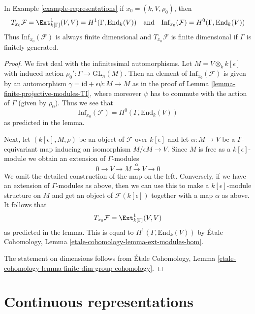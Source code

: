 \begin{lemma}
\label{lemma-representations-TI}
In Example \ref{example-representations}
if $x_0 = (k, V, \rho_0)$, then
$$
T_{x_0}\mathcal{F} = \Ext^1_{k[\Gamma]}(V, V) =
H^1(\Gamma, \text{End}_k(V))
\quad\text{and}\quad
\text{Inf}_{x_0}(\mathcal{F}) = H^0(\Gamma, \text{End}_k(V))
$$
Thus $\text{Inf}_{x_0}(\mathcal{F})$ is always finite dimensional
and $T_{x_0}\mathcal{F}$ is finite dimensional
if $\Gamma$ is finitely generated.
\end{lemma}

\begin{proof}
We first deal with the infinitesimal automorphisms.
Let $M = V \otimes_k k[\epsilon]$ with induced action
$\rho_0' : \Gamma \to \text{GL}_n(M)$.
Then an element of $\text{Inf}_{x_0}(\mathcal{F})$
is given by an automorphism
$\gamma = \text{id} + \epsilon \psi : M \to M$
as in the proof of Lemma \ref{lemma-finite-projective-modules-TI},
where moreover $\psi$ has to commute
with the action of $\Gamma$ (given by $\rho_0$).
Thus we see that
$$
\text{Inf}_{x_0}(\mathcal{F}) = H^0(\Gamma, \text{End}_k(V))
$$
as predicted in the lemma.

\medskip\noindent
Next, let $(k[\epsilon], M, \rho)$ be an object of $\mathcal{F}$
over $k[\epsilon]$ and let $\alpha : M \to V$ be a $\Gamma$-equivariant map
inducing an isomorphism $M/\epsilon M \to V$.
Since $M$ is free as a $k[\epsilon]$-module we obtain
an extension of $\Gamma$-modules
$$
0 \to V \to M \xrightarrow{\alpha} V \to 0
$$
We omit the detailed construction of the map on the left.
Conversely, if we have an extension of $\Gamma$-modules as
above, then we can use this to make a $k[\epsilon]$-module
structure on $M$ and get an object of $\mathcal{F}(k[\epsilon])$
together with a map $\alpha$ as above.
It follows that
$$
T_{x_0}\mathcal{F} = \Ext^1_{k[\Gamma]}(V, V)
$$
as predicted in the lemma. This is equal to
$H^1(\Gamma, \text{End}_k(V))$ by
\'Etale Cohomology, Lemma \ref{etale-cohomology-lemma-ext-modules-hom}.

\medskip\noindent
The statement on dimensions follows from
\'Etale Cohomology, Lemma
\ref{etale-cohomology-lemma-finite-dim-group-cohomology}.
\end{proof}




\section{Continuous representations}
\label{section-continuous-representations}

